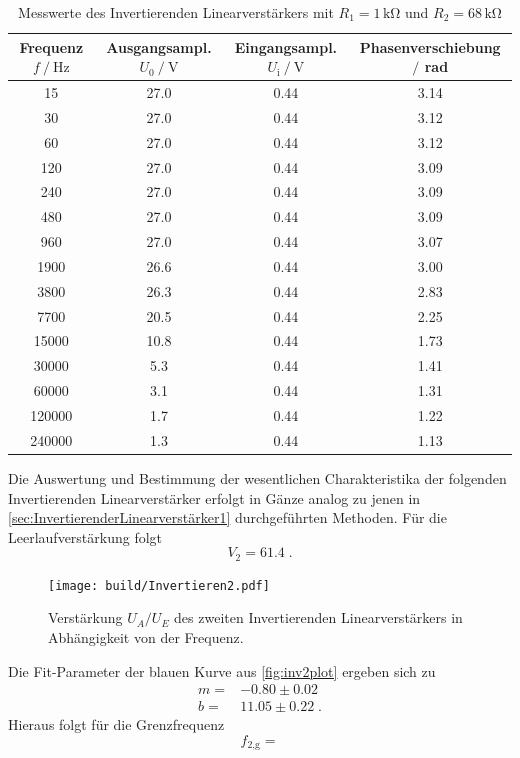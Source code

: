 \begin{table}
    \centering
    \caption{Messwerte des Invertierenden Linearverstärkers mit $R_1=1\,\unit{\kilo\ohm}$ und $R_2=68\,\unit{\kilo\ohm}$}
    \begin{tabular}{c c c c}
        \toprule
        Frequenz $f\mathbin{/}\unit{\hertz}$ & Ausgangsampl. $U_0\mathbin{/}\unit{\volt}$& Eingangsampl. $U_{\text{i}}\mathbin{/}\unit{\volt}$ & Phasenverschiebung $\mathbin{/}$ rad\\
        \midrule
        15&	27.0&	0.44&	3.14\\		    
        30&	27.0&	0.44&	3.12\\		
        60&	27.0&	0.44&	3.12\\		
        120&	27.0&	0.44&	3.09\\		
        240&	27.0&	0.44&	3.09\\		
        480	&27.0&	0.44&	3.09\\		
        960	&27.0&	0.44&	3.07\\		
        1900&	26.6&	0.44&	3.00\\	
        3800& 26.3&	0.44&	2.83\\	
        7700&	20.5&	0.44&	2.25\\	
        15000&	10.8&	0.44&	1.73\\	
        30000&	5.3&	0.44&	1.41	\\	
        60000&	3.1	&0.44&	1.31	\\	
        120000&	1.7	&0.44&	1.22	\\	
        240000&	1.3	&0.44&	1.13	\\
        \bottomrule
    \end{tabular}
    \label{tab:InvAmp2}
\end{table}
Die Auswertung und Bestimmung der wesentlichen Charakteristika der folgenden Invertierenden Linearverstärker erfolgt in Gänze analog zu jenen in \autoref{sec:InvertierenderLinearverstärker1} durchgeführten Methoden.
Für die Leerlaufverstärkung folgt
\begin{equation*}
    V_2= 61.4\; .
\end{equation*}
\begin{figure}
    \centering
    \texttt{[image: build/Invertieren2.pdf]}
    \caption{Verstärkung $U_A/U_E$ des zweiten Invertierenden Linearverstärkers in Abhängigkeit von der Frequenz.}
    \label{fig:inv2plot}
\end{figure}
Die Fit-Parameter der blauen Kurve aus \autoref{fig:inv2plot} ergeben sich zu
\begin{align*}
    m=&-0.80\pm 0.02 \\
    b=& 11.05\pm 0.22\; .
\end{align*}
Hieraus folgt für die Grenzfrequenz
\begin{equation*}
    f_{2\text{,g}}=
\end{equation*}
